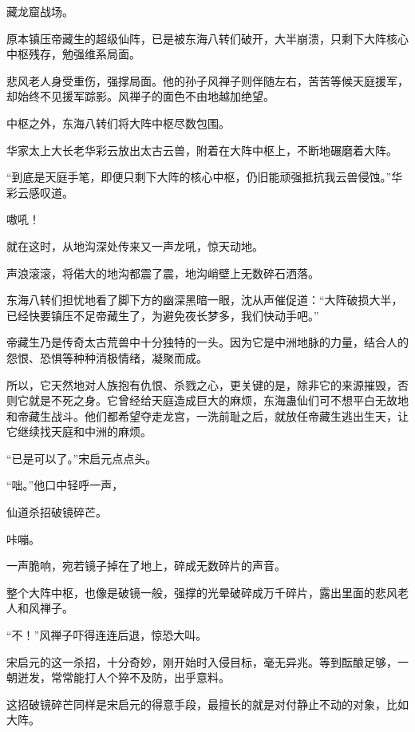 
\begin{this_body}



藏龙窟战场。

原本镇压帝藏生的超级仙阵，已是被东海八转们破开，大半崩溃，只剩下大阵核心中枢残存，勉强维系局面。

悲风老人身受重伤，强撑局面。他的孙子风禅子则伴随左右，苦苦等候天庭援军，却始终不见援军踪影。风禅子的面色不由地越加绝望。

中枢之外，东海八转们将大阵中枢尽数包围。

华家太上大长老华彩云放出太古云兽，附着在大阵中枢上，不断地碾磨着大阵。

“到底是天庭手笔，即便只剩下大阵的核心中枢，仍旧能顽强抵抗我云兽侵蚀。”华彩云感叹道。

嗷吼！

就在这时，从地沟深处传来又一声龙吼，惊天动地。

声浪滚滚，将偌大的地沟都震了震，地沟峭壁上无数碎石洒落。

东海八转们担忧地看了脚下方的幽深黑暗一眼，沈从声催促道：“大阵破损大半，已经快要镇压不足帝藏生了，为避免夜长梦多，我们快动手吧。”

帝藏生乃是传奇太古荒兽中十分独特的一头。因为它是中洲地脉的力量，结合人的怨恨、恐惧等种种消极情绪，凝聚而成。

所以，它天然地对人族抱有仇恨、杀戮之心，更关键的是，除非它的来源摧毁，否则它就是不死之身。它曾经给天庭造成巨大的麻烦，东海蛊仙们可不想平白无故地和帝藏生战斗。他们都希望夺走龙宫，一洗前耻之后，就放任帝藏生逃出生天，让它继续找天庭和中洲的麻烦。

“已是可以了。”宋启元点点头。

“咄。”他口中轻呼一声，

仙道杀招破镜碎芒。

咔嘣。

一声脆响，宛若镜子掉在了地上，碎成无数碎片的声音。

整个大阵中枢，也像是破镜一般，强撑的光晕破碎成万千碎片，露出里面的悲风老人和风禅子。

“不！”风禅子吓得连连后退，惊恐大叫。

宋启元的这一杀招，十分奇妙，刚开始时入侵目标，毫无异兆。等到酝酿足够，一朝迸发，常常能打人个猝不及防，出乎意料。

这招破镜碎芒同样是宋启元的得意手段，最擅长的就是对付静止不动的对象，比如大阵。


\end{this_body}
